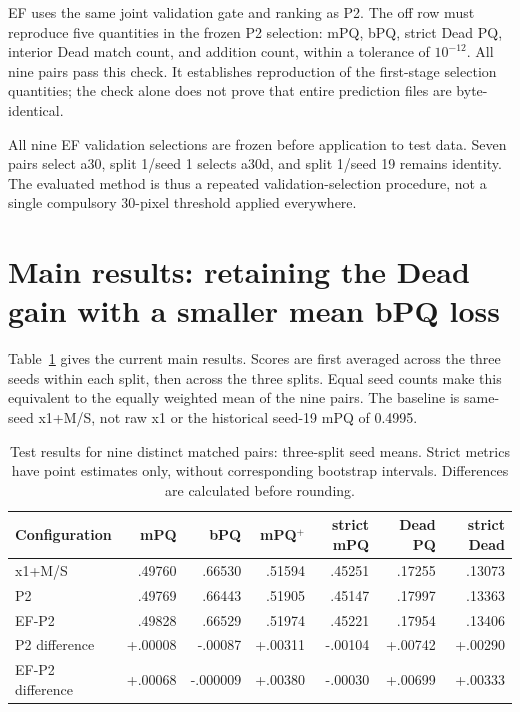\documentclass[11pt,a4paper]{article}
\begin{document}
EF uses the same joint validation gate and ranking as P2. The off row must reproduce five quantities in the frozen P2 selection: mPQ, bPQ, strict Dead PQ, interior Dead match count, and addition count, within a tolerance of $10^{-12}$. All nine pairs pass this check. It establishes reproduction of the first-stage selection quantities; the check alone does not prove that entire prediction files are byte-identical.

All nine EF validation selections are frozen before application to test data. Seven pairs select a30, split 1/seed 1 selects a30d, and split 1/seed 19 remains identity. The evaluated method is thus a repeated validation-selection procedure, not a single compulsory 30-pixel threshold applied everywhere.

\section{Main results: retaining the Dead gain with a smaller mean bPQ loss}

Table~\ref{tab:main} gives the current main results. Scores are first averaged across the three seeds within each split, then across the three splits. Equal seed counts make this equivalent to the equally weighted mean of the nine pairs. The baseline is same-seed x1+M/S, not raw x1 or the historical seed-19 mPQ of 0.4995.

\begin{table}[H]
\centering\small
\setlength{\tabcolsep}{4pt}
\caption{Test results for nine distinct matched pairs: three-split seed means. Strict metrics have point estimates only, without corresponding bootstrap intervals. Differences are calculated before rounding.}
\label{tab:main}
\begin{tabular}{lrrrrrr}\toprule
Configuration & mPQ & bPQ & mPQ$^+$ & strict mPQ & Dead PQ & strict Dead\\\midrule
x1+M/S & .49760 & .66530 & .51594 & .45251 & .17255 & .13073\\
P2 & .49769 & .66443 & .51905 & .45147 & .17997 & .13363\\
EF-P2 & .49828 & .66529 & .51974 & .45221 & .17954 & .13406\\\midrule
P2 difference & +.00008 & -.00087 & +.00311 & -.00104 & +.00742 & +.00290\\
EF-P2 difference & +.00068 & -.000009 & +.00380 & -.00030 & +.00699 & +.00333\\\bottomrule
\end{tabular}
\end{table}
\end{document}
